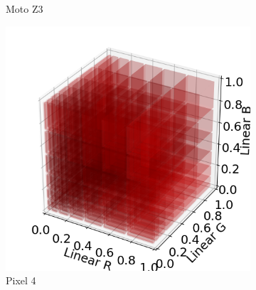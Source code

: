 \begin{figure}[tp]
\begin{subfigure}[]{0.25\columnwidth}
		\caption{Moto Z3}
	\end{subfigure}
	\hfill
	\begin{subfigure}[]{0.25\columnwidth}
		\includegraphics[width=\linewidth]{figure/004_Pixel4_error_cuve.png}
		\caption{Pixel 4}
	\end{subfigure}
	\hfill
	\begin{subfigure}[]{0.15\columnwidth}

\end{subfigure}
\end{figure}
